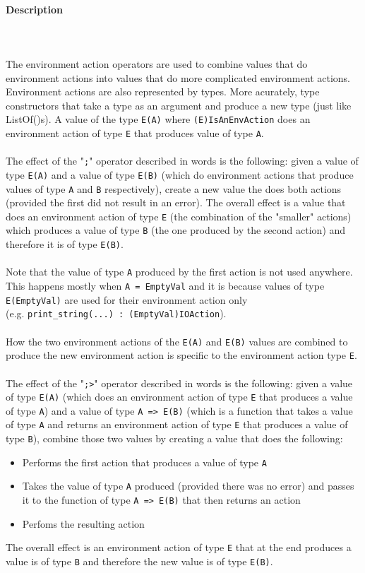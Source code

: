 \documentclass{article}
\def\pend{\mbox{} \\\\}
\begin{document}
\paragraph{Description}\pend
The environment action operators are used to combine values that do environment
actions into values that do more complicated environment actions. Environment
actions are also represented by types. More acurately, type constructors that
take a type as an argument and produce a new type (just like ListOf()s). A
value of the type \texttt{E(A)} where \texttt{(E)IsAnEnvAction} does an
environment action of type \texttt{E} that produces value of type \texttt{A}.
\\\\
The effect of the "\texttt{;}" operator described in words is the following:
given a value of type \texttt{E(A)} and a value of type \texttt{E(B)} (which
do environment actions that produce values of type \texttt{A} and \texttt{B}
respectively), create a new value the does both actions (provided the first did
not result in an error).  The overall effect is a value that does an
environment action of type \texttt{E} (the combination of the "smaller"
actions) which produces a value of type \texttt{B} (the one produced by the second
action) and therefore it is of type \texttt{E(B)}.
\\\\
Note that the value of type \texttt{A} produced by the first action is not used
anywhere. This happens mostly when \texttt{A = EmptyVal} and it is 
because values of type \texttt{E(EmptyVal)} are used for their environment
action only \\(e.g. \texttt{print_string(...)\ :\ (EmptyVal)IOAction}).
\\\\
How the two environment actions of the \texttt{E(A)} and \texttt{E(B)} values
are combined to produce the new environment action is specific to the
environment action type \texttt{E}.
\\\\
The effect of the "\texttt{;>}" operator described in words is the following:
given a value of type \texttt{E(A)} (which does an environment action of type
\texttt{E} that produces a value of type \texttt{A}) and a value of type
\texttt{A => E(B)} (which is a function that takes a value of type \texttt{A}
and returns an environment action of type \texttt{E} that produces a value
of type \texttt{B}), combine those two values by creating a value that does the
following: 
\begin{itemize}
\item
Performs the first action that produces a value of type \texttt{A}

\item
Takes the value of type \texttt{A} produced (provided there was no error) and
passes it to the function of type \texttt{A => E(B)} that then returns an
action

\item
Perfoms the resulting action 
\end{itemize}
The overall effect is an environment action  of type \texttt{E} that at the end
produces a value is of type \texttt{B} and therefore the new value is of type
\texttt{E(B)}.
\end{document}

